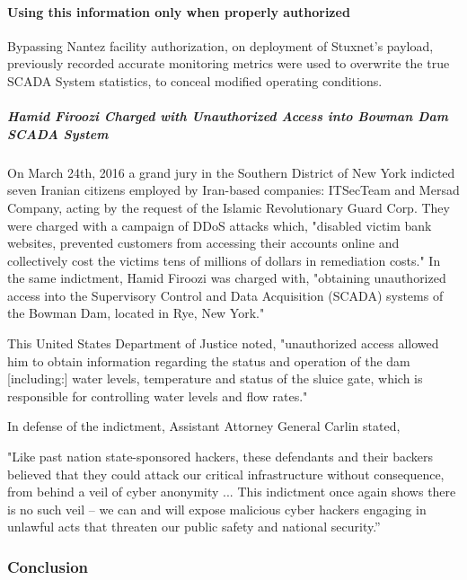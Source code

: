 \documentclass[12pt]{article}
\begin{document}
\begin{multicols}{2}
\paragraph{Using this information only when properly authorized}

Bypassing Nantez facility authorization, on deployment of Stuxnet's payload, previously recorded accurate monitoring metrics were used to overwrite the true SCADA System statistics, to conceal modified operating conditions.

\subparagraph{Hamid Firoozi Charged with Unauthorized Access into Bowman Dam SCADA System}

On March 24th, 2016 a grand jury in the Southern District of New York indicted seven Iranian citizens employed by Iran-based companies: ITSecTeam and Mersad Company, acting by the request of the Islamic Revolutionary Guard Corp. They were charged with a campaign of DDoS attacks which, "disabled victim bank websites, prevented customers from accessing their accounts online and collectively cost the victims tens of millions of dollars in remediation costs."\cite{sevenIraniansIndicted} In the same indictment, Hamid Firoozi was charged with, "obtaining unauthorized access into the Supervisory Control and Data Acquisition (SCADA) systems of the Bowman Dam, located in Rye, New York."\cite{sevenIraniansIndicted}

This United States Department of Justice noted, "unauthorized access allowed him to obtain information regarding the status and operation of the dam [including:] water levels, temperature and status of the sluice gate, which is responsible for controlling water levels and flow rates."\cite{sevenIraniansIndicted}

In defense of the indictment, Assistant Attorney General Carlin stated,

\begin{displayquote}
"Like past nation state-sponsored hackers, these defendants and their backers believed that they could attack our critical infrastructure without consequence, from behind a veil of cyber anonymity ... This indictment once again shows there is no such veil – we can and will expose malicious cyber hackers engaging in unlawful acts that threaten our public safety and national security.”\cite{sevenIraniansIndicted}
\end{displayquote}

\subsubsection{Conclusion}


\end{multicols}
\end{document}
